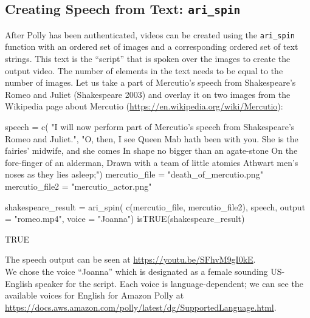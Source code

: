 \hypertarget{creating-speech-from-text-ari_spin}{%
\subsection{\texorpdfstring{Creating Speech from Text:
\texttt{ari\_spin}}{Creating Speech from Text: ari\_spin}}\label{creating-speech-from-text-ari_spin}}

After Polly has been authenticated, videos can be created using the
\texttt{ari\_spin} function with an ordered set of images and a
corresponding ordered set of text strings. This text is the ``script''
that is spoken over the images to create the output video. The number of
elements in the text needs to be equal to the number of images. Let us
take a part of Mercutio's speech from Shakespeare's Romeo and Juliet
(Shakespeare 2003) and overlay it on two images from the Wikipedia page
about Mercutio (\url{https://en.wikipedia.org/wiki/Mercutio}):

\begin{Schunk}
\begin{Sinput}
speech =  c(
  "I will now perform part of Mercutio's speech from Shakespeare's Romeo and Juliet.", 
  "O, then, I see Queen Mab hath been with you.
   She is the fairies' midwife, and she comes
   In shape no bigger than an agate-stone
   On the fore-finger of an alderman,
   Drawn with a team of little atomies
   Athwart men's noses as they lies asleep;")
mercutio_file = "death_of_mercutio.png"
mercutio_file2 = "mercutio_actor.png"
\end{Sinput}
\end{Schunk}

\begin{Schunk}
\begin{Sinput}
shakespeare_result = ari_spin(
  c(mercutio_file, mercutio_file2),
  speech, output = "romeo.mp4", voice = "Joanna")
isTRUE(shakespeare_result)
\end{Sinput}
\end{Schunk}

\begin{Schunk}
\begin{Soutput}
[1] TRUE
\end{Soutput}
\end{Schunk}

The speech output can be seen at \url{https://youtu.be/SFhvM9gI0kE}.\\
We chose the voice ``Joanna'' which is designated as a female sounding
US-English speaker for the script. Each voice is language-dependent; we
can see the available voices for English for Amazon Polly at
\url{https://docs.aws.amazon.com/polly/latest/dg/SupportedLanguage.html}.

